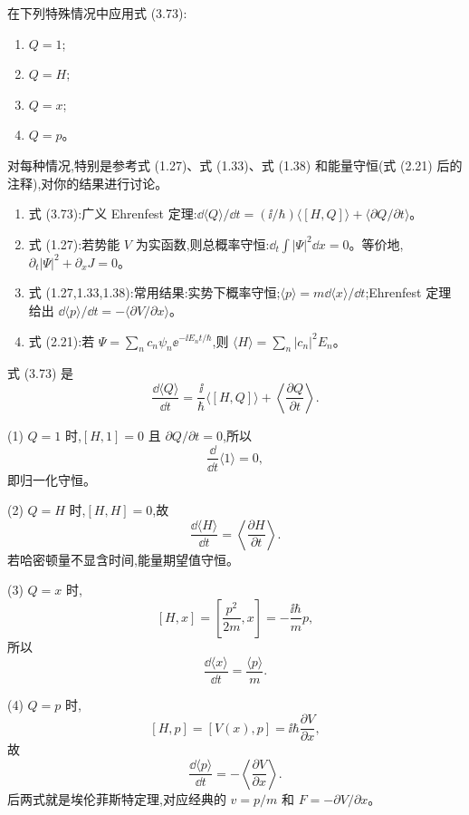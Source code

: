 \begin{question}
在下列特殊情况中应用式 (3.73):
\begin{enumerate}
\item $Q=1$;
\item $Q=H$;
\item $Q=x$;
\item $Q=p$。
\end{enumerate}
对每种情况,特别是参考式 (1.27)、式 (1.33)、式 (1.38) 和能量守恒(式 (2.21) 后的注释),对你的结果进行讨论。

\par\smallskip
{}
\begin{enumerate}[leftmargin=2.2em,itemsep=0.12em,topsep=0.12em,parsep=0pt]
\item 式 (3.73):广义 Ehrenfest 定理:$\dd\langle Q\rangle/\dd t=(\ii/\hbar)\langle[H,Q]\rangle+\langle\partial Q/\partial t\rangle$。
\item 式 (1.27):若势能 $V$ 为实函数,则总概率守恒:$\dd_t\int |\Psi|^2\dd x=0$。等价地,$\partial_t|\Psi|^2+\partial_xJ=0$。
\item 式 (1.27,1.33,1.38):常用结果:实势下概率守恒;$\langle p\rangle=m\dd\langle x\rangle/\dd t$;Ehrenfest 定理给出 $\dd\langle p\rangle/\dd t=-\langle \partial V/\partial x\rangle$。
\item 式 (2.21):若 $\Psi=\sum_n c_n\psi_n \ee^{-\ii E_nt/\hbar}$,则 $\langle H\rangle=\sum_n |c_n|^2E_n$。
\end{enumerate}

\begin{solution}
式 (3.73) 是
\[
\frac{\dd\langle Q\rangle}{\dd t}
=\frac{\ii}{\hbar}\langle[H,Q]\rangle+\left\langle\frac{\partial Q}{\partial t}\right\rangle .
\]

(1) $Q=1$ 时,$[H,1]=0$ 且 $\partial Q/\partial t=0$,所以
\[
\frac{\dd}{\dd t}\langle 1\rangle=0,
\]
即归一化守恒。

(2) $Q=H$ 时,$[H,H]=0$,故
\[
\frac{\dd\langle H\rangle}{\dd t}=\left\langle\frac{\partial H}{\partial t}\right\rangle.
\]
若哈密顿量不显含时间,能量期望值守恒。

(3) $Q=x$ 时,
\[
[H,x]=\left[\frac{p^2}{2m},x\right]=-\frac{\ii\hbar}{m}p,
\]
所以
\[
\frac{\dd\langle x\rangle}{\dd t}=\frac{\langle p\rangle}{m}.
\]

(4) $Q=p$ 时,
\[
[H,p]=[V(x),p]=\ii\hbar\frac{\partial V}{\partial x},
\]
故
\[
\frac{\dd\langle p\rangle}{\dd t}=-\left\langle\frac{\partial V}{\partial x}\right\rangle.
\]
后两式就是埃伦菲斯特定理,对应经典的 $v=p/m$ 和 $F=-\partial V/\partial x$。
\end{solution}
\end{question}

